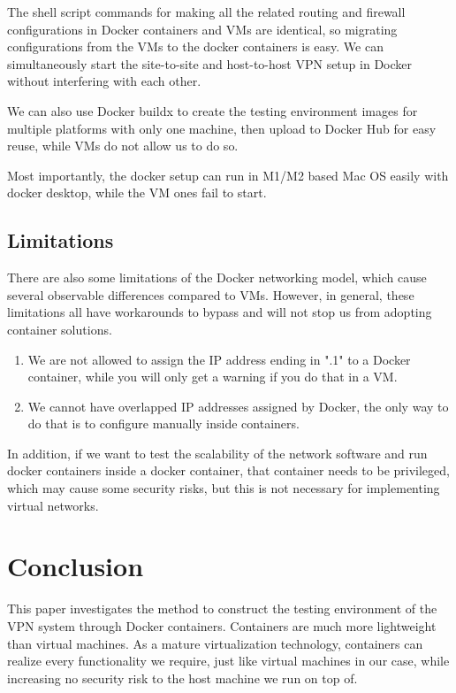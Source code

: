 \documentclass[article]{aaltoseries}
\begin{document}
The shell script commands for making all the related routing and firewall configurations in Docker containers and VMs are identical, so migrating configurations from the VMs to the docker containers is easy. We can simultaneously start the site-to-site and host-to-host VPN setup in Docker without interfering with each other.

We can also use Docker buildx \cite{dockermultiplatform} to create the testing environment images for multiple platforms with only one machine, then upload to Docker Hub for easy reuse, while VMs do not allow us to do so.

Most importantly, the docker setup can run in M1/M2 based Mac OS easily with docker desktop, while the VM ones fail to start.

\subsection{Limitations}

There are also some limitations of the Docker networking model, which cause several observable differences compared to VMs. However, in general, these limitations all have workarounds to bypass and will not stop us from adopting container solutions.

\begin{enumerate}
\setlength{\itemsep}{0pt}
\setlength{\parsep}{0pt}
\setlength{\parskip}{0pt}
\item We are not allowed to assign the IP address ending in ".1" to a Docker container, while you will only get a warning if you do that in a VM.
\item We cannot have overlapped IP addresses assigned by Docker, the only way to do that is to configure manually inside containers.
\end{enumerate}

In addition, if we want to test the scalability of the network software and run docker containers inside a docker container, that container needs to be privileged, which may cause some security risks, but this is not necessary for implementing virtual networks.



\section{Conclusion}

This paper investigates the method to construct the testing environment of the VPN system through Docker containers. Containers are much more lightweight than virtual machines. As a mature virtualization technology, containers can realize every functionality we require, just like virtual machines in our case, while increasing no security risk to the host machine we run on top of.
\end{document}
